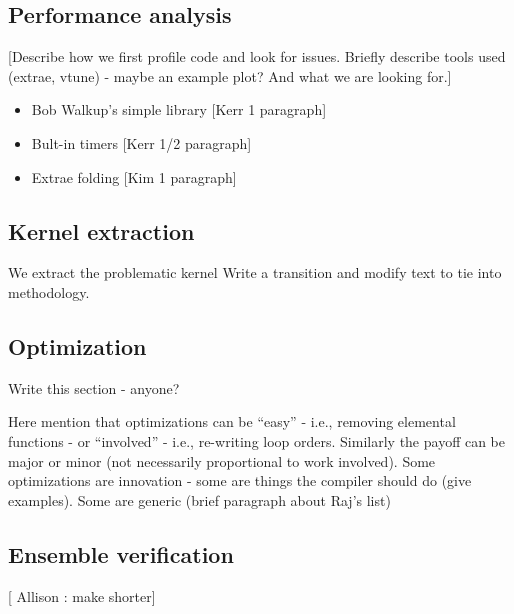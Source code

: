\subsection{Performance analysis}

[Describe how we first profile code and look for issues.  Briefly describe tools used (extrae, vtune) - maybe an example plot? And what we are looking for.]

{\color{red}
 \begin{itemize}
   \item {Bob Walkup's simple library} [Kerr 1 paragraph]
   \item {Bult-in timers} [Kerr 1/2 paragraph]
   \item {Extrae folding} [Kim 1 paragraph]
 \end{itemize}
}


\subsection{Kernel extraction}

We extract the problematic kernel {\color{red} Write a transition and modify text to tie into methodology}.  



\subsection{Optimization}

 {\color{red} Write this section - anyone?}

Here mention that optimizations can be ``easy'' - i.e., removing elemental functions - or ``involved'' - i.e., re-writing loop orders.  Similarly the payoff can be major or minor (not necessarily proportional to work involved).
Some optimizations are innovation - some are things the compiler should do (give examples).  Some are generic (brief paragraph about Raj's list)


\subsection{Ensemble verification}

[ {\color{red} Allison :} make shorter]


